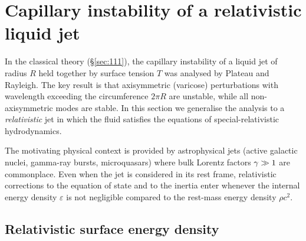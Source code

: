 %

\section{Capillary instability of a relativistic liquid jet}
\label{sec:rel-111}

In the classical theory (\S\ref{sec:111}), the capillary instability of
a liquid jet of radius $R$ held together by surface tension $T$ was
analysed by Plateau and Rayleigh.  The key result is that
axisymmetric (varicose) perturbations with wavelength exceeding
the circumference $2\pi R$ are unstable, while all non-axisymmetric
modes are stable.  In this section we generalise the analysis to a
\emph{relativistic} jet in which the fluid satisfies the equations of
special-relativistic hydrodynamics.

The motivating physical context is provided by astrophysical jets
(active galactic nuclei, gamma-ray bursts, microquasars) where bulk
Lorentz factors $\gamma \gg 1$ are commonplace.  Even when the jet is
considered in its rest frame, relativistic corrections to the
equation of state and to the inertia enter whenever the internal
energy density $\varepsilon$ is not negligible compared to the rest-mass
energy density $\rho c^{2}$.

\subsection{Relativistic surface energy density}
\label{sec:rel-111-surface}

